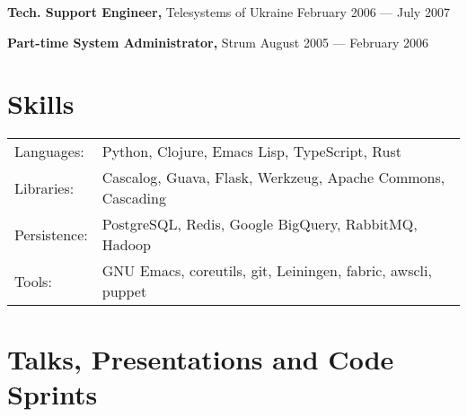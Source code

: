 \documentclass[margin]{res}
\begin{document}
\begin{resume}
{\bf Tech. Support Engineer,} Telesystems of Ukraine \hfill February 2006 --- July 2007




{\bf Part-time System Administrator,} Strum \hfill August 2005 --- February 2006



\section{Skills}
\begin{tabular}{l p{3in}}
  Languages: & Python, Clojure, Emacs Lisp, TypeScript, Rust \\
  Libraries: & Cascalog, Guava, Flask, Werkzeug, Apache Commons, Cascading \\
  Persistence: & PostgreSQL, Redis, Google BigQuery, RabbitMQ, Hadoop \\
  Tools: & GNU Emacs, coreutils, git, Leiningen, fabric, awscli, puppet \\
\end{tabular}

\section{Talks, Presentations and Code Sprints}


\end{resume}
\end{document}
